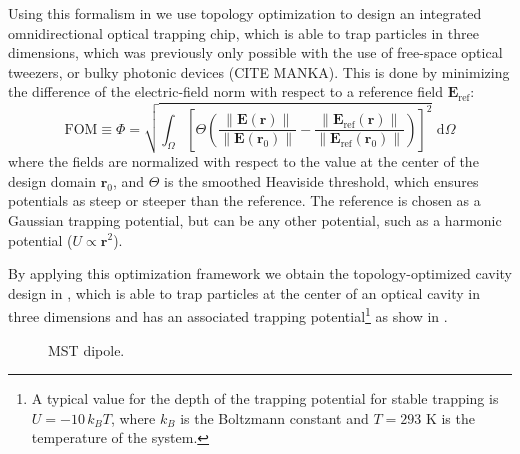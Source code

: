 Using this formalism in \cite{ownpub1} we use topology optimization to design an integrated omnidirectional optical trapping chip, which is able to trap particles in three dimensions,
which was previously only possible with the use of free-space optical tweezers, or bulky photonic devices (CITE MANKA). This is done by minimizing 
the difference of the electric-field norm with respect to a reference field $\mathbf{E}_\text{ref}$:
\begin{equation}
    \text{FOM} \equiv \Phi=\sqrt{\int_{\Omega}\left[\Theta\left(\frac{\|\mathbf{E}(\mathbf{r})\|}{\left\|\mathbf{E}\left(\mathbf{r}_0\right)\right\|}-\frac{\left\|\mathbf{E}_{\text{ref}}(\mathbf{r})\right\|}{\left\|\mathbf{E}_{\text{ref}}\left(\mathbf{r}_0\right)\right\|}\right)\right]^2} \text{~d} \Omega
    \end{equation}
where the fields are normalized with respect to the value at the center of the design domain $\mathbf{r}_0$, and $\Theta$ is the smoothed Heaviside threshold, which ensures
potentials as steep or steeper than the reference. The reference is chosen as a Gaussian trapping potential, but can be any other potential, such as a harmonic potential ($U\propto\mathbf{r}^2$).

By applying this optimization framework we obtain the topology-optimized cavity design in , which is able to trap particles at the center of an optical
cavity in three dimensions and has an associated trapping potential\footnote{A typical value for the depth of the trapping potential for stable trapping is $U=-10\, k_B T$, where
 $ k_B$ is the Boltzmann constant and $T=293$ K is the temperature of the system.} as show in .

\begin{figure}[tb]
    \centering
    \caption{MST dipole.}
    \label{fig:MST_dipole}
\end{figure}

